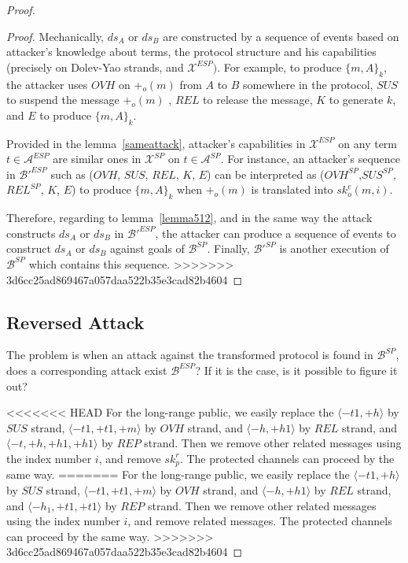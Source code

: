 \begin{Definition}
\begin{table}[b]
\begin{proof}
\begin{proof}
Mechanically, $ds_A$ or $ds_B$ are constructed by a sequence of events based on attacker's knowledge about terms, the protocol structure and his capabilities (precisely on Dolev-Yao strands, and $\mathcal{X}^{ESP})$. For example, to produce $\{m,A\}_k$, the attacker uses $OVH$ on $+_o(m)$ from $A$ to $B$ somewhere in the protocol, $SUS$ to suspend the message $+_o(m)$ , $REL$ to release the message, $K$ to generate $k$, and $E$ to produce $\{m,A\}_k$. 

Provided in the lemma~\ref{sameattack}, attacker's capabilities in $\mathcal{X}^{ESP}$ on any term $t \in \mathcal{A}^{ESP}$ are similar ones in $\mathcal{X}^{SP}$ on $t \in \mathcal{A}^{SP}$. For instance, an attacker's sequence in $\mathcal{B'}^{ESP}$ such as ($OVH$, $SUS$, $REL$, $K$, $E$) can be interpreted as ($OVH^{SP}$,$SUS^{SP}$, $REL^{SP}$, $K$, $E$) to produce $\{m,A\}_k$ when $+_o(m)$ is translated into $sk^e_o(m,i)$. 

Therefore, regarding to lemma~\ref{lemma512}, and in the same way the attack constructs $ds_A$ or $ds_B$ in $\mathcal{B'}^{ESP}$, the attacker can produce a sequence of events to construct $ds_A$ or $ds_B$ against goals of $\mathcal{B}^{SP}$. Finally, $\mathcal{B'}^{SP}$ is another execution of $\mathcal{B}^{SP}$ which contains this sequence.
>>>>>>> 3d6cc25ad869467a057daa522b35e3cad82b4604
\end{proof}

\subsection{Reversed Attack}\label{reverse}

The problem is when an attack against the transformed protocol is found in $\mathcal{B}^{SP}$, does a corresponding attack exist $\mathcal{B}^{ESP}$? If it is the case, is it possible to figure it out? 

<<<<<<< HEAD
For the long-range public, we easily replace the $\langle -t1, +h \rangle $ by $SUS$ strand, $\langle -t1,+t1,+m \rangle$ by $OVH$ strand, and $ \langle -h,+h1\rangle$ by $REL$ strand, and $ \langle -t, +h,+h1,+h1 \rangle$ by $REP$ strand. Then we remove other related messages using the index number $i$, and remove $sk^r_p$. The protected channels can proceed by the same way. 
=======
For the long-range public, we easily replace the $\langle -t1, +h \rangle $ by $SUS$ strand, $\langle -t1,+t1,+m \rangle$ by $OVH$ strand, and $ \langle -h,+h1\rangle$ by $REL$ strand, and $ \langle -h_1, +t1,+t1 \rangle$ by $REP$ strand. Then we remove other related messages using the index number $i$, and remove related messages. The protected channels can proceed by the same way. 
>>>>>>> 3d6cc25ad869467a057daa522b35e3cad82b4604


\end{proof}
\end{table}
\end{Definition}
